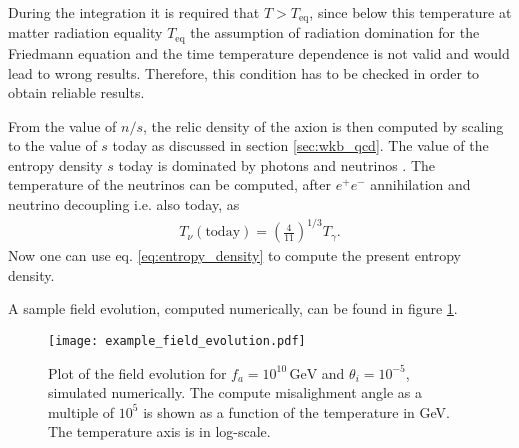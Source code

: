 \documentclass[twoside,a4paper, 12pt]{article}
\numberwithin{equation}{section}
\begin{document}
\noindent
During the integration it is required that $T > T_\mathrm{eq}$, since below this temperature at matter radiation equality $T_\mathrm{eq}$
the assumption of radiation domination for the Friedmann equation and the time temperature dependence is not valid
and would lead to wrong results. Therefore, this condition has to be checked in order to obtain reliable results.

\noindent
From the value of $n / s$, the relic density of the axion is then computed by scaling to the value of $s$ today as discussed in section \ref{sec:wkb_qcd}.
The value of the entropy density $s$ today is dominated by photons and neutrinos \cite[Sec. 3.5]{TheEarlyUniverseKolbAndTurner}. 
The temperature of the neutrinos can be computed, after $e^+ e^-$ annihilation and neutrino decoupling i.e. also today, as \cite[Eq. 3.86]{TheEarlyUniverseKolbAndTurner}
\begin{align}
    T_\nu(\mathrm{today}) = \left( \frac{4}{11} \right)^{1 / 3} T_\gamma.
\end{align}
Now one can use eq. \eqref{eq:entropy_density} to compute the present entropy density.

\noindent
A sample field evolution, computed numerically, can be found in figure \ref{fig:sample_field_evo}.
\begin{figure}[H]
    \centering
    \texttt{[image: example\_field\_evolution.pdf]}
    \caption{Plot of the field evolution for $f_a = 10^{10} \, \mathrm{GeV}$
    and $\theta_i = 10^{-5}$, simulated numerically. 
    The compute misalighment angle as a multiple of $10^{5}$ is shown as a function of the
    temperature in GeV.
    The temperature axis is in log-scale.
    }
    \label{fig:sample_field_evo}
\end{figure}
\end{document}
